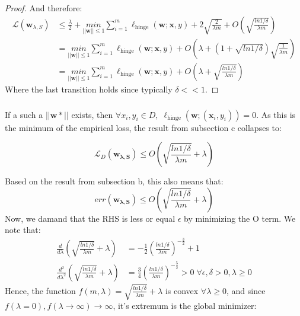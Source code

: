 \begin{proof}
    And therefore:
    \begin{equation*}
        \begin{split}      
            \mathcal{L}(\boldsymbol{w}_{\lambda, S}) &\leq \frac{\lambda}{2} + \underset{||\boldsymbol{w}||\leq 1}{min} \sum_{i=1}^m \ell_{\text{hinge}}(\boldsymbol{w}; \boldsymbol{x}, y) + 2 \sqrt{\frac{2}{\lambda m}} + O\left(\sqrt{\frac{ln 1/\delta}{\lambda m}} \right) \\
            &= \underset{||\boldsymbol{w}||\leq 1}{min} \sum_{i=1}^m \ell_{\text{hinge}}(\boldsymbol{w}; \boldsymbol{x}, y) + O\left(\lambda + \left(1 + \sqrt{ln 1/\delta}\right)\sqrt{\frac{1}{\lambda m}} \right) \\
            &= \underset{||\boldsymbol{w}||\leq 1}{min} \sum_{i=1}^m \ell_{\text{hinge}}(\boldsymbol{w}; \boldsymbol{x}, y) + O\left(\lambda + \sqrt{\frac{ln 1/\delta}{\lambda m}} \right)
        \end{split}
    \end{equation*}
    Where the last transition holds since typically $\delta << 1$.
\end{proof}

\subsubsection{}
If a such a $||\boldsymbol{w*}||$ exists, then $\forall x_i, y_i \in D, \; \ell_{\text{hinge}}(\boldsymbol{w};(\boldsymbol{x}_i, y_i)) = 0 $. As this is the minimum of the empirical loss, the result from subsection c collapses to:

\begin{equation*}
    \mathcal{L}_D(\boldsymbol{w_{\lambda, S}}) \leq O\left(\sqrt{\frac{ln 1/\delta}{\lambda m}} + \lambda \right)
\end{equation*}

Based on the result from subsection b, this also means that:
\begin{equation*}
    err(\boldsymbol{w_{\lambda, S}}) \leq O\left(\sqrt{\frac{ln 1/\delta}{\lambda m}} + \lambda \right)
\end{equation*}
Now, we damand that the RHS is less or equal $\epsilon$ by minimizing the O term.
We note that:
\begin{equation*}
    \begin{split}
        \frac{d}{d\lambda} \left(\sqrt{\frac{ln 1/\delta}{\lambda m}} + \lambda\right) &= -\frac{1}{2} (\frac{ln 1/\delta}{\lambda m})^{-\frac{3}{2}} + 1 \\
        \frac{d^2}{d\lambda^2} \left(\sqrt{\frac{ln 1/\delta}{\lambda m}} + \lambda\right) &= 
        \frac{3}{4} (\frac{ln 1/\delta}{\lambda m})^{-\frac{5}{2}} > 0 \; \forall \epsilon, \delta > 0, \lambda \geq 0
    \end{split}
\end{equation*}
Hence, the function $f(m, \lambda) = \sqrt{\frac{ln 1/\delta}{\lambda m}} + \lambda$ is convex $\forall \lambda \geq 0$, and since $f(\lambda=0), f(\lambda \rightarrow \infty) \rightarrow \infty$, it's extremum is the global minimizer:

